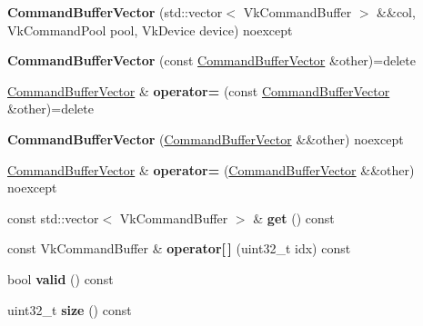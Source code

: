 \begin{DoxyCompactItemize}
\item 
\mbox{\label{structblaze_1_1vkw_1_1CommandBufferVector_a958685dbd858837158aa36036ba8a129}} 
{\bfseries Command\+Buffer\+Vector} (std\+::vector$<$ Vk\+Command\+Buffer $>$ \&\&col, Vk\+Command\+Pool pool, Vk\+Device device) noexcept
\item 
\mbox{\label{structblaze_1_1vkw_1_1CommandBufferVector_ad2f554793145de69e87bc03494ab0398}} 
{\bfseries Command\+Buffer\+Vector} (const \hyperlink{structblaze_1_1vkw_1_1CommandBufferVector}{Command\+Buffer\+Vector} \&other)=delete
\item 
\mbox{\label{structblaze_1_1vkw_1_1CommandBufferVector_a2a0a9983bd5b715c235da8f14b1037e8}} 
\hyperlink{structblaze_1_1vkw_1_1CommandBufferVector}{Command\+Buffer\+Vector} \& {\bfseries operator=} (const \hyperlink{structblaze_1_1vkw_1_1CommandBufferVector}{Command\+Buffer\+Vector} \&other)=delete
\item 
\mbox{\label{structblaze_1_1vkw_1_1CommandBufferVector_a9a05f07efa208ba166a448cf8d7e0426}} 
{\bfseries Command\+Buffer\+Vector} (\hyperlink{structblaze_1_1vkw_1_1CommandBufferVector}{Command\+Buffer\+Vector} \&\&other) noexcept
\item 
\mbox{\label{structblaze_1_1vkw_1_1CommandBufferVector_a15f31e4591595e0e13bffe5580e163cc}} 
\hyperlink{structblaze_1_1vkw_1_1CommandBufferVector}{Command\+Buffer\+Vector} \& {\bfseries operator=} (\hyperlink{structblaze_1_1vkw_1_1CommandBufferVector}{Command\+Buffer\+Vector} \&\&other) noexcept
\item 
\mbox{\label{structblaze_1_1vkw_1_1CommandBufferVector_aa4f0b0dd9a9d40c90990dda764eb5cc1}} 
const std\+::vector$<$ Vk\+Command\+Buffer $>$ \& {\bfseries get} () const
\item 
\mbox{\label{structblaze_1_1vkw_1_1CommandBufferVector_a0534597d37187e8928a77e306e3001cb}} 
const Vk\+Command\+Buffer \& {\bfseries operator\mbox{[}$\,$\mbox{]}} (uint32\+\_\+t idx) const
\item 
\mbox{\label{structblaze_1_1vkw_1_1CommandBufferVector_a799ba2a2b20c10fce30a961c9280010d}} 
bool {\bfseries valid} () const
\item 
\mbox{\label{structblaze_1_1vkw_1_1CommandBufferVector_af37c1ad11211ef1306711ee0f1cf49b7}} 
uint32\+\_\+t {\bfseries size} () const
\end{DoxyCompactItemize}
